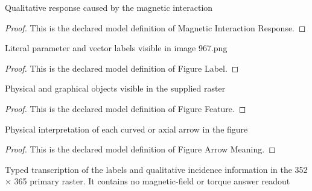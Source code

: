 \begin{definition}
  \label{def:physics:phyx-mini-0967:phyxminiproblems-problemphyxmini0967-magneticinteractionresponse}
  Qualitative response caused by the magnetic interaction
\end{definition}
\begin{proof}
  This is the declared model definition of Magnetic Interaction Response.
\end{proof}
\begin{definition}
  \label{def:physics:phyx-mini-0967:phyxminiproblems-problemphyxmini0967-figurelabel}
  Literal parameter and vector labels visible in image 967.png
\end{definition}
\begin{proof}
  This is the declared model definition of Figure Label.
\end{proof}
\begin{definition}
  \label{def:physics:phyx-mini-0967:phyxminiproblems-problemphyxmini0967-figurefeature}
  Physical and graphical objects visible in the supplied raster
\end{definition}
\begin{proof}
  This is the declared model definition of Figure Feature.
\end{proof}
\begin{definition}
  \label{def:physics:phyx-mini-0967:phyxminiproblems-problemphyxmini0967-figurearrowmeaning}
  Physical interpretation of each curved or axial arrow in the figure
\end{definition}
\begin{proof}
  This is the declared model definition of Figure Arrow Meaning.
\end{proof}
\begin{definition}
  \label{def:physics:phyx-mini-0967:phyxminiproblems-problemphyxmini0967-rotatingcylinderdiskfigure}
  Typed transcription of the labels and qualitative incidence information in the 352 × 365 primary raster. It contains no magnetic-field or torque answer readout
\end{definition}
